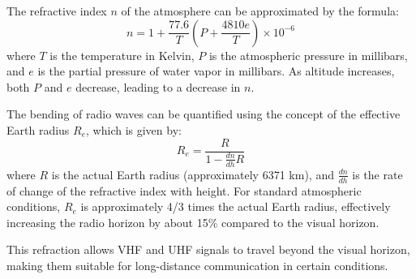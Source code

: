 The refractive index \( n \) of the atmosphere can be approximated by the formula:
\[
n = 1 + \frac{77.6}{T} \left( P + \frac{4810 e}{T} \right) \times 10^{-6}
\]
where \( T \) is the temperature in Kelvin, \( P \) is the atmospheric pressure in millibars, and \( e \) is the partial pressure of water vapor in millibars. As altitude increases, both \( P \) and \( e \) decrease, leading to a decrease in \( n \).

The bending of radio waves can be quantified using the concept of the effective Earth radius \( R_e \), which is given by:
\[
R_e = \frac{R}{1 - \frac{dn}{dh} R}
\]
where \( R \) is the actual Earth radius (approximately 6371 km), and \( \frac{dn}{dh} \) is the rate of change of the refractive index with height. For standard atmospheric conditions, \( R_e \) is approximately 4/3 times the actual Earth radius, effectively increasing the radio horizon by about 15\% compared to the visual horizon.

This refraction allows VHF and UHF signals to travel beyond the visual horizon, making them suitable for long-distance communication in certain conditions.

